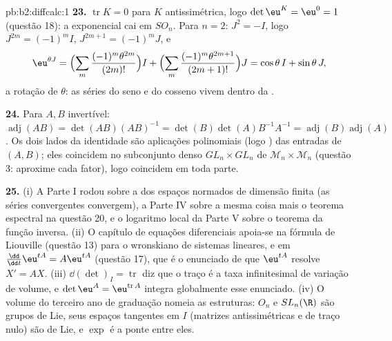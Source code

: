 \begin{solution}{pb:b2:diffcalc:1}
\textbf{23.} $\operatorname{tr}K = 0$ para $K$ antissimétrica,
logo $\det\eu^K = \eu^0 = 1$ (questão 18): a exponencial
cai em $SO_n$. Para $n = 2$: $J^2 = -I$, logo $J^{2m} =
(-1)^mI$, $J^{2m+1} = (-1)^mJ$, e
\[
\eu^{\theta J}
= \Bigl(\sum_m\frac{(-1)^m\theta^{2m}}{(2m)!}\Bigr)I
+ \Bigl(\sum_m\frac{(-1)^m\theta^{2m+1}}{(2m+1)!}\Bigr)J
= \cos\theta\,I + \sin\theta\,J ,
\]
a rotação de $\theta$: as séries do seno e do cosseno vivem
dentro da .

\textbf{24.} Para $A, B$ invertível: $\operatorname{adj}(AB) =
\det(AB)(AB)^{-1} = \det(B)\det(A)B^{-1}A^{-1} =
\operatorname{adj}(B)\operatorname{adj}(A)$. Os dois lados da
identidade são aplicações polinomiais (logo ) das entradas
de $(A, B)$; eles coincidem no subconjunto denso $GL_n\times GL_n$
de $\mathcal M_n\times\mathcal M_n$ (questão 3: aproxime
cada fator), logo coincidem em toda parte.

\textbf{25.} (i) A Parte I rodou sobre a  dos espaços normados
de dimensão finita (as séries  convergentes convergem), a Parte IV
sobre a mesma coisa mais o teorema espectral na questão 20, e o logaritmo local
da Parte V sobre o teorema da função inversa. (ii) O
capítulo de equações diferenciais apoia-se na fórmula de Liouville
(questão 13) para o wronskiano de sistemas lineares, e em
$\frac{\dd}{\dd t}\eu^{tA} = A\eu^{tA}$ (questão 17), que é
o enunciado de que $\eu^{tA}$ resolve $X' = AX$. (iii)
$\dd(\det)_I = \operatorname{tr}$ diz que o traço é a
taxa infinitesimal de variação de volume, e $\det\eu^A =
\eu^{\operatorname{tr}A}$ integra globalmente esse enunciado.
(iv) O volume do terceiro ano de graduação nomeia as estruturas: $O_n$ e
$SL_n(\R)$ são grupos de Lie, seus espaços tangentes em $I$
(matrizes antissimétricas e de traço nulo) são  de Lie, e
$\exp$ é a ponte entre eles.
\end{solution}
